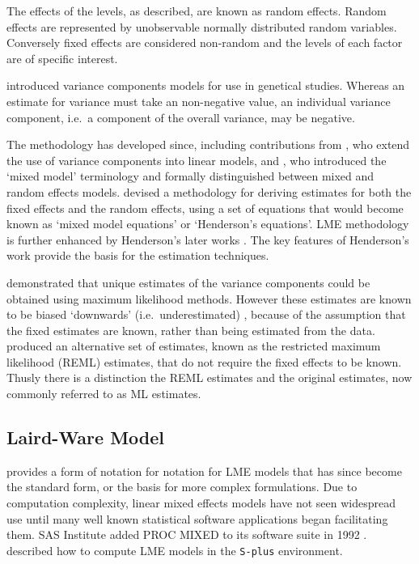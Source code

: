 \documentclass[12pt, a4paper]{report}
\theoremstyle{plain}
\theoremstyle{definition}
\theoremstyle{remark}
\begin{document}
The effects of the levels, as described, are known as random effects. Random effects are represented by unobservable normally distributed random variables. Conversely fixed effects are considered non-random and the levels of each factor are of specific interest.
			
			\citet{Fisher4} introduced variance components models for use in genetical studies. Whereas an estimate for variance must take an non-negative value, an individual variance component, i.e.\ a component of the overall variance, may be negative.
			
			The methodology has developed since, including contributions from
			\citet{tippett}, who extend the use of variance components into linear models, and \citet{eisenhart}, who introduced the `mixed model' terminology and formally distinguished between mixed and random effects models. \citet{Henderson:1950} devised a methodology for deriving estimates for both the fixed effects and the random effects, using a set of equations that would become known as `mixed model equations' or `Henderson's equations'.
			LME methodology is further enhanced by Henderson's later works \citep{Henderson53, Henderson59,Henderson63,Henderson73,Henderson84a}. The key features of Henderson's work provide the basis for the estimation techniques.
			
			\citet{HartleyRao} demonstrated that unique estimates of the variance components could be obtained using maximum likelihood methods. However these estimates are known to be biased `downwards' (i.e.\ underestimated) , because of the assumption that the fixed estimates are known, rather than being estimated from the data. \citet{PattersonThompson} produced an alternative set of estimates, known as the restricted maximum likelihood (REML) estimates, that do not require the fixed effects to be known. Thusly there is a distinction the REML estimates and the original estimates, now commonly referred to as ML estimates.
			
	\subsection{Laird-Ware Model} 
	\citet{LW82} provides a form of notation for notation for LME models that has since become the standard form, or the basis for more complex formulations. Due to computation complexity, linear mixed effects models have not seen widespread use until many well known statistical software applications began facilitating them. SAS Institute added PROC MIXED to its software suite in 1992 \citep{singer}. \citet{PB} described how to compute LME models in the \texttt{S-plus} environment.
	
\end{document}
